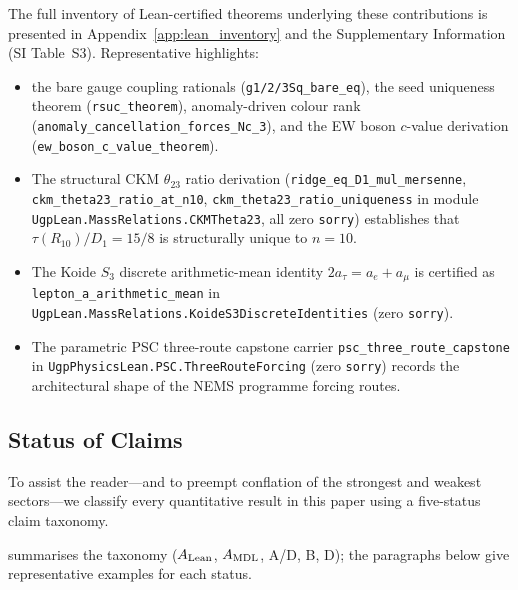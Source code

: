 \documentclass[11pt]{article}
\theoremstyle{remark}
\begin{document}
\begin{sloppypar}
\noindent The full inventory of Lean-certified theorems underlying these contributions
is presented in Appendix~\ref{app:lean_inventory} and the Supplementary Information
(SI Table~S3).  Representative highlights:
\begin{itemize}[leftmargin=1.5em,itemsep=0.18em,topsep=0.2em]
  \item the bare gauge coupling rationals
    (\texttt{g1/2/3Sq\_bare\_eq}), the seed uniqueness theorem (\texttt{rsuc\_theorem}),
    anomaly-driven colour rank (\texttt{anomaly\_cancellation\_forces\_Nc\_3}), and the
    EW boson $c$-value derivation (\texttt{ew\_boson\_c\_value\_theorem}).
  \item The structural CKM $\theta_{23}$ ratio derivation
    (\texttt{ridge\_eq\_D1\_mul\_mersenne},
    \texttt{ckm\_theta23\_ratio\_at\_n10}, \texttt{ckm\_theta23\_ratio\_uniqueness}
    in module \texttt{UgpLean.\allowbreak MassRelations.\allowbreak CKMTheta23}, all zero \texttt{sorry})
    establishes that $\tau(R_{10})/D_1 = 15/8$ is structurally unique to $n = 10$.
  \item The Koide $S_3$ discrete arithmetic-mean identity
    $2 a_\tau = a_e + a_\mu$ is certified as
    \texttt{lepton\_a\_arithmetic\_mean} in
    \texttt{UgpLean.\allowbreak MassRelations.\allowbreak KoideS3DiscreteIdentities}
    (zero \texttt{sorry}).
  \item The parametric PSC three-route capstone carrier
    \texttt{psc\_three\_route\_capstone} in
    \texttt{UgpPhysicsLean.\allowbreak PSC.\allowbreak ThreeRouteForcing}
    (zero \texttt{sorry}) records the architectural shape of the NEMS programme
    forcing routes.
\end{itemize}
\end{sloppypar}


\subsection{Status of Claims}
\label{subsec:status}

To assist the reader---and to preempt conflation of the strongest and weakest sectors---we classify every quantitative result in this paper using a five-status claim taxonomy.

 summarises the taxonomy ($A_{\rm Lean}$, $A_{\rm MDL}$, A/D, B, D); the paragraphs below give representative examples for each status.
\end{document}
